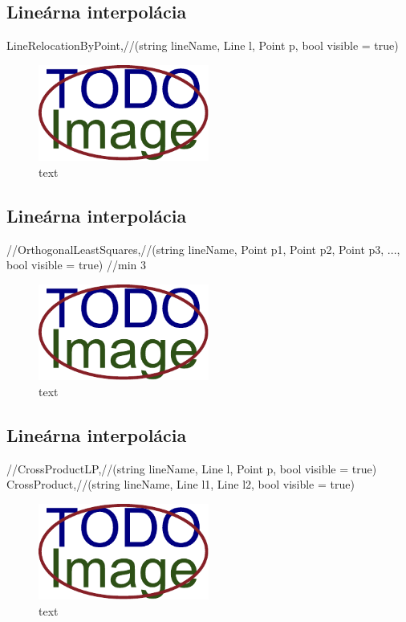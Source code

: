 \subsection{Lineárna interpolácia}
		LineRelocationByPoint,//(string lineName, Line l, Point p, bool visible = true)


\begin{figure}[H]
	\centering
	\includegraphics[width=0.5\textwidth]{obrazky-figures/placeholder.pdf}
	\caption{text}
	\label{fig:1}
\end{figure}

\subsection{Lineárna interpolácia}
		//OrthogonalLeastSquares,//(string lineName, Point p1, Point p2, Point p3, ..., bool visible = true) //min 3

\begin{figure}[H]
	\centering
	\includegraphics[width=0.5\textwidth]{obrazky-figures/placeholder.pdf}
	\caption{text}
	\label{fig:1}
\end{figure}


\subsection{Lineárna interpolácia}
		//CrossProductLP,//(string lineName, Line l, Point p, bool visible = true)
		CrossProduct,//(string lineName, Line l1, Line l2, bool visible = true)

\begin{figure}[H]
	\centering
	\includegraphics[width=0.5\textwidth]{obrazky-figures/placeholder.pdf}
	\caption{text}
	\label{fig:1}
\end{figure}





